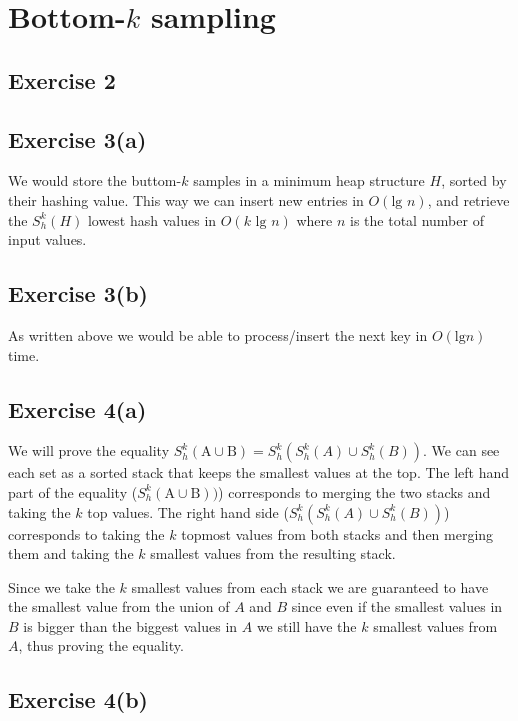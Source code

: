 \section{Bottom-$k$ sampling}

\subsection{Exercise 2}

\subsection{Exercise 3(a)}
We would store the buttom-$k$ samples in a minimum heap structure $H$, sorted by
their hashing value. This way we can insert new entries in $O(\text{lg } n)$,
and retrieve the $S^{k}_{h}(H)$ lowest hash values in $O(k \text{ lg } n)$ where
$n$ is the total number of input values.

\subsection{Exercise 3(b)}
As written above we would be able to process/insert the next key in $O(\text{lg
} n)$ time.

\subsection{Exercise 4(a)}
We will prove the equality $S^{k}_{h}(\text{A} \cup \text{B}) =
S^{k}_{h}(S^{k}_{h}(A) \cup S^{k}_{h}(B))$.
%
We can see each set as a sorted stack that keeps the smallest values at the
top. The left hand part of the equality ($S^{k}_{h}(\text{A} \cup \text{B}))$)
corresponds to merging the two stacks and taking the $k$ top values.
%
The right hand side ($S^{k}_{h}(S^{k}_{h}(A) \cup S^{k}_{h}(B))$) corresponds to
taking the $k$ topmost values from both stacks and then merging them and taking
the $k$ smallest values from the resulting stack.

Since we take the $k$ smallest values from each stack we are guaranteed to have
the smallest value from the union of $A$ and $B$ since even if the smallest
values in $B$ is bigger than the biggest values in $A$ we still have the $k$
smallest values from $A$, thus proving the equality.

\subsection{Exercise 4(b)}

